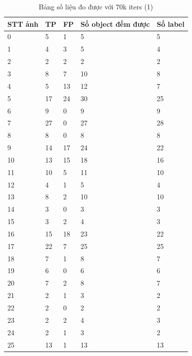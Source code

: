 \begin{table}[H]
    \begin{tabular}{p{2cm}  p{2cm}  p{2cm} p{4cm} p{2cm} }
    \hline		
	STT ảnh & TP & FP & Số object đếm được & Số label\\
	\hline
	0   & 5  & 1  &     5     &   5   \\		
	\hline
	1   & 4  & 3  &     5     &   4   \\     
	\hline
	2   & 2  & 2  &     2     &   2   \\     
	\hline
	3   & 8  & 7  &     10    &   8   \\     
	\hline
	4   & 5  & 13 &     12    &   7   \\     
	\hline
	5   & 17 & 24 &     30    &   25  \\     
	\hline
	6   & 9  & 0  &     9     &   9   \\     
	\hline
	7   & 27 & 0  &     27    &   28  \\     
	\hline
	8   & 8  & 0  &     8     &   8   \\     
	\hline
	9   & 14 & 17 &     24    &   22  \\     
	\hline
	10  & 13 & 15 &     18    &   16  \\     
	\hline
	11  & 10 & 5  &     11    &   10  \\     
	\hline
	12  & 4  & 1  &     5     &   4   \\     
	\hline
	13  & 8  & 2  &     10    &   10  \\     
	\hline
	14  & 3  & 0  &     3     &   3   \\     
	\hline
	15  & 3  & 2  &     4     &   3   \\     
	\hline
	16  & 15 & 18 &     23    &   22  \\     
	\hline
	17  & 22 & 7  &     25    &   25  \\     
	\hline
	18  & 7  & 1  &     8     &   7   \\     
	\hline
	19  & 6  & 0  &     6     &   6   \\     
	\hline
	20  & 7  & 2  &     8     &   7   \\     
	\hline
	21  & 2  & 1  &     3     &   2   \\     
	\hline
	22  & 2  & 0  &     2     &   2   \\     
	\hline
	23  & 2  & 2  &     4     &   3   \\     
	\hline
	24  & 2  & 1  &     3     &   2   \\     
	\hline
	25  & 13 & 1  &     13    &   13  \\     
	\end{tabular}
	\caption{Bảng số liệu đo được với 70k iters (1)}
    \label{chap3:case1:table01}    
\end{table}

